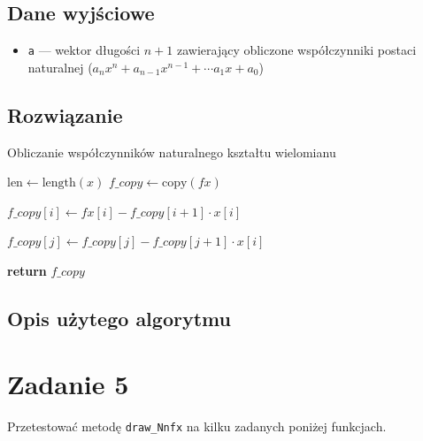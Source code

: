 \documentclass{article}
\begin{document}
\subsection*{Dane wyjściowe}
	\begin{itemize}
	    \item \texttt{a} — wektor długości $n+1$ zawierający obliczone współczynniki postaci naturalnej ($a_n x^n + a_{n-1} x^{n-1} + \cdots a_1 x + a_0$)
	\end{itemize}
\subsection*{Rozwiązanie}
	\begin{algorithm}
	\caption{Obliczanie współczynników naturalnego kształtu wielomianu}
	\begin{algorithmic}[1]
	        \State $\text{len} \gets \text{length}(x)$
	        \State $f\_copy \gets \text{copy}(fx)$
	        
	            \State $f\_copy[i] \gets fx[i] - f\_copy[i + 1] \cdot x[i]$
	            
	                \State $f\_copy[j] \gets f\_copy[j] - f\_copy[j + 1] \cdot x[i]$
	            \EndFor
	        \EndFor
	        
	        \State \textbf{return} $f\_copy$
	    \EndFunction
	\end{algorithmic}
	\end{algorithm}
\subsection*{Opis użytego algorytmu}

\clearpage

\section*{Zadanie 5}
	Przetestować metodę \texttt{draw\_Nnfx} na kilku zadanych poniżej funkcjach.
\end{document}

